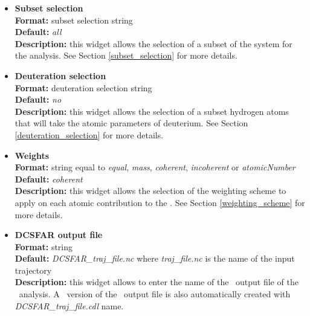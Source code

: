 \documentclass[a4paper,11pt]{report}
\begin{document}
\begin{itemize}
\item \textbf{Subset selection}\\
\textbf{Format:} subset selection string\\
\textbf{Default:} \textit{all}\\
\textbf{Description:} this widget allows the selection of a subset of the system for the analysis. 
See Section \ref{subset_selection} for more details.

\item \textbf{Deuteration selection}\\
\textbf{Format:} deuteration selection string\\
\textbf{Default:} \textit{no}\\
\textbf{Description:} this widget allows the selection of a subset hydrogen atoms that will take the atomic parameters 
of deuterium. See Section \ref{deuteration_selection} for more details.

\item \textbf{Weights}\\
\textbf{Format:} string equal to \textit{equal}, \textit{mass}, \textit{coherent}, \textit{incoherent} or \textit{atomicNumber}\\
\textbf{Default:} \textit{coherent}\\
\textbf{Description:} this widget allows the selection of the weighting scheme to apply on each atomic contribution 
to the \DCSFAR . See Section \ref{weighting_scheme} for more details. 

\item \textbf{DCSFAR output file}\\
\textbf{Format:} string\\
\textbf{Default:} \textit{DCSFAR\_traj\_file.nc} where \textit{traj\_file.nc} is the name of the input trajectory\\
\textbf{Description:} this widget allows to enter the name of the \NetCDF\ output file of the \DCSFAR\ analysis. A \CDL\ 
version of the \NetCDF\ output file is also automatically created with \textit{DCSFAR\_traj\_file.cdl} name.
\end{itemize}
\end{document}
